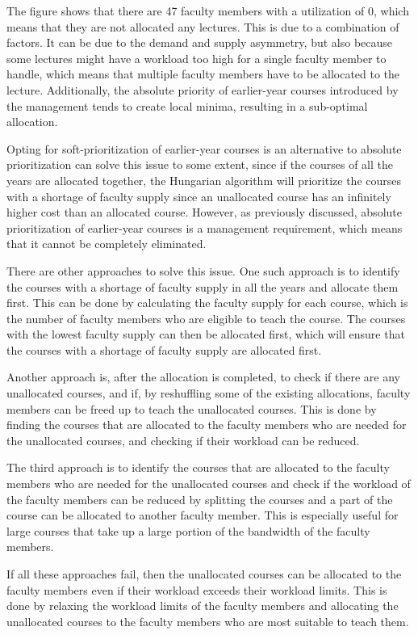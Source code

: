 The figure shows that there are 47 faculty members with a utilization of 0, which means that they are not allocated any lectures. This is due to a combination of factors. It can be due to the demand and supply asymmetry, but also because some lectures might have a workload too high for a single faculty member to handle, which means that multiple faculty members have to be allocated to the lecture. Additionally, the absolute priority of earlier-year courses introduced by the management tends to create local minima, resulting in a sub-optimal allocation.

Opting for soft-prioritization of earlier-year courses is an alternative to absolute prioritization can solve this issue to some extent, since if the courses of all the years are allocated together, the Hungarian algorithm will prioritize the courses with a shortage of faculty supply since an unallocated course has an infinitely higher cost than an allocated course. However, as previously discussed, absolute prioritization of earlier-year courses is a management requirement, which means that it cannot be completely eliminated.

There are other approaches to solve this issue. One such approach is to identify the courses with a shortage of faculty supply in all the years and allocate them first. This can be done by calculating the faculty supply for each course, which is the number of faculty members who are eligible to teach the course. The courses with the lowest faculty supply can then be allocated first, which will ensure that the courses with a shortage of faculty supply are allocated first.

Another approach is, after the allocation is completed, to check if there are any unallocated courses, and if, by reshuffling some of the existing allocations, faculty members can be freed up to teach the unallocated courses. This is done by finding the courses that are allocated to the faculty members who are needed for the unallocated courses, and checking if their workload can be reduced.

The third approach is to identify the courses that are allocated to the faculty members who are needed for the unallocated courses and check if the workload of the faculty members can be reduced by splitting the courses and a part of the course can be allocated to another faculty member. This is especially useful for large courses that take up a large portion of the bandwidth of the faculty members.

If all these approaches fail, then the unallocated courses can be allocated to the faculty members even if their workload exceeds their workload limits. This is done by relaxing the workload limits of the faculty members and allocating the unallocated courses to the faculty members who are most suitable to teach them.

